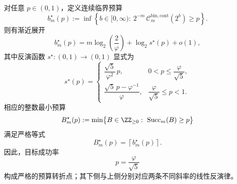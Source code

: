 \begin{theorem}[给定目标成功率的连续临界预算反演公式]\label{thm:xi-time-part9zk-continuous-critical-budget-inversion}
对任意 \(p\in(0,1)\)，定义连续临界预算
\[
b_m^\star(p)
:=
\inf\left\{
b\in [0,\infty):\
2^{-m}\,\mathcal C_m^{\mathrm{bin,cont}}(2^b)\ge p
\right\}.
\]
则有渐近展开
\[
b_m^\star(p)
=
m\log_2\!\left(\frac{2}{\varphi}\right)
+
\log_2 s^\star(p)
+
o(1),
\]
其中反演函数 \(s^\star:(0,1)\to(0,1)\) 显式为
\[
s^\star(p)
=
\begin{cases}
\dfrac{\sqrt5}{\varphi^2}\,p,
& 0<p\le \dfrac{\varphi}{\sqrt5},\\[8pt]
\dfrac{\sqrt5\,p-\varphi^{-1}}{\varphi},
& \dfrac{\varphi}{\sqrt5}\le p<1.
\end{cases}
\]
相应的整数最小预算
\[
B_m^\star(p)
:=
\min\bigl\{B\in\ZZ_{\ge 0}:\ \mathrm{Succ}_m(B)\ge p\bigr\}
\]
满足严格等式
\[
B_m^\star(p)=\left\lceil b_m^\star(p)\right\rceil.
\]
因此，目标成功率
\[
p=\frac{\varphi}{\sqrt5}
\]
构成严格的预算转折点；其下侧与上侧分别对应两条不同斜率的线性反演律。
\end{theorem}
